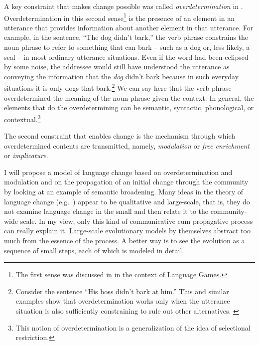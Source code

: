 A key constraint that makes change possible was called \emph{overdetermination} in \citet[Section~6.1.5]{parikh:le}. Overdetermination in this second sense\footnote{The first sense was discussed in  in the context of Language Games.} is the presence of an element in an utterance that provides information about another element in that utterance. For example, in the sentence, ``The dog didn't bark,'' the verb phrase  constrains the noun phrase to refer to something that can bark -- such as a dog or, less likely, a seal -- in most ordinary utterance situations. Even if the word  had been eclipsed by some noise, the addressee would still have understood the utterance as conveying the information that the \emph{dog} didn't bark because in such everyday situations it is only dogs that bark.\footnote{Consider the sentence ``His boss didn't bark at him.'' This and similar examples show that overdetermination works only when the utterance situation is also sufficiently constraining to rule out other alternatives. \label{foot:bark example}} We can say here that the verb phrase overdetermined the meaning of the noun phrase given the context. In general, the elements that do the overdetermining can be semantic, syntactic, phonological, or contextual.\footnote{This notion of overdetermination is a generalization of the idea of selectional restriction.}

The second constraint that enables change is the mechanism through which overdetermined contents are transmitted, namely, \emph{modulation} or \emph{free enrichment} or \emph{implicature}. 



I will propose a model of language change based on overdetermination and modulation and on the propagation of an initial change through the community by looking at an example of semantic broadening. Many ideas in the theory of language change (e.g.\ \citealt{cb:hl}) appear to be qualitative and large-scale, that is, they do not examine language change in the small and then relate it to the community-wide scale. In my view, only this kind of communicative cum propagative process can really explain it. Large-scale evolutionary models by themselves abstract too much from the essence of the process. A better way is to see the evolution as a sequence of small steps, each of which is modeled in detail.


